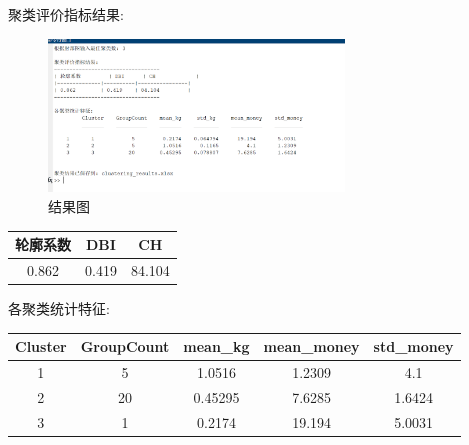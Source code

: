 \documentclass{MathNoteCN}
\begin{document}
聚类评价指标结果:
\begin{figure}[H]
    \centering
    \includegraphics[width=0.7\textwidth]{结果.png}
    \caption{结果图}
\end{figure}

\begin{table}[H]
    \centering
    \begin{tabular}{c c c}
    \toprule
    轮廓系数 & DBI & CH \\
    \midrule
    0.862 & 0.419 & 84.104 \\
    \bottomrule
    \end{tabular}
\end{table}

各聚类统计特征:
\begin{table}[H]
    \centering
    \begin{tabular}{c c c c c}
    \toprule
    Cluster & GroupCount & mean\_kg & mean\_money & std\_money \\
    \midrule
    1 & 5 & 1.0516 & 1.2309 & 4.1 \\
    2 & 20 & 0.45295 & 7.6285 & 1.6424 \\
    3 & 1 & 0.2174 & 19.194 & 5.0031 \\
    \bottomrule
    \end{tabular}
\end{table}
\end{document}
